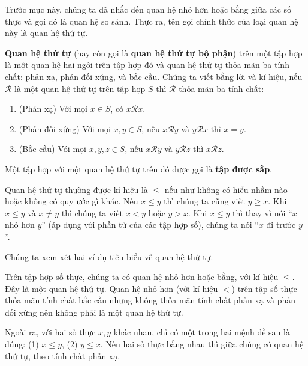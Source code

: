 Trước mục này, chúng ta đã nhắc đến quan hệ nhỏ hơn hoặc bằng giữa các số thực và gọi đó là quan hệ so sánh. Thực ra, tên gọi chính thức của loại quan hệ này là quan hệ thứ tự.

\begin{definition}
    \textbf{Quan hệ thứ tự} (hay còn gọi là \textbf{quan hệ thứ tự bộ phận}) trên một tập hợp là một quan hệ hai ngôi trên tập hợp đó và quan hệ thứ tự thỏa mãn ba tính chất: phản xạ, phản đối xứng, và bắc cầu. Chúng ta viết bằng lời và kí hiệu, nếu $\mathscr{R}$ là một quan hệ thứ tự trên tập hợp $S$ thì $\mathscr{R}$ thỏa mãn ba tính chất:
    \begin{enumerate}[label={(\roman*)}]
        \item (Phản xạ) Với mọi $x\in S$, có $x\mathscr{R}x$.
        \item (Phản đối xứng) Với mọi $x, y\in S$, nếu $x\mathscr{R}y$ và $y\mathscr{R}x$ thì $x = y$.
        \item (Bắc cầu) Vói mọi $x, y, z\in S$, nếu $x\mathscr{R}y$ và $y\mathscr{R}z$ thì $x\mathscr{R}z$.
    \end{enumerate}

    \noindent Một tập hợp với một quan hệ thứ tự trên đó được gọi là \textbf{tập được sắp}.
\end{definition}

Quan hệ thứ tự thường được kí hiệu là $\leq$ nếu như không có hiểu nhầm nào hoặc không có quy ước gì khác. Nếu $x\leq y$ thì chúng ta cũng viết $y\geq x$. Khi $x\leq y$ và $x\ne y$ thì chúng ta viết $x < y$ hoặc $y > x$. Khi $x\leq y$ thì thay vì nói ``$x$ nhỏ hơn $y$'' (áp dụng với phần tử của các tập hợp số), chúng ta nói ``$x$ đi trước $y$''.

Chúng ta xem xét hai ví dụ tiêu biểu về quan hệ thứ tự.
\begin{example}
    Trên tập hợp số thực, chúng ta có quan hệ nhỏ hơn hoặc bằng, với kí hiệu $\leq$. Đây là một quan hệ thứ tự. Quan hệ nhỏ hơn (với kí hiệu $<$) trên tập số thực thỏa mãn tính chất bắc cầu nhưng không thỏa mãn tính chất phản xạ và phản đối xứng nên không phải là một quan hệ thứ tự.

    Ngoài ra, với hai số thực $x, y$ khác nhau, chỉ có một trong hai mệnh đề sau là đúng: (1) $x\leq y$, (2) $y\leq x$. Nếu hai số thực bằng nhau thì giữa chúng có quan hệ thứ tự, theo tính chất phản xạ.
\end{example}

